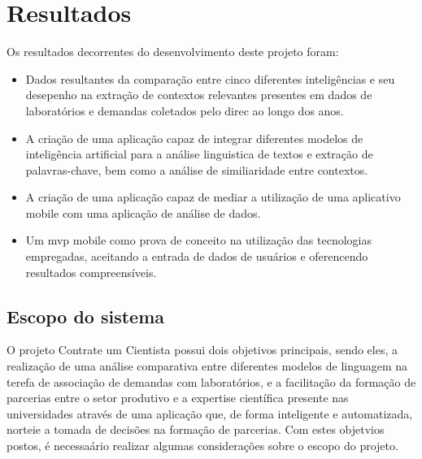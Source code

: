 \chapter{Resultados}\label{cap:resultados}

Os resultados decorrentes do desenvolvimento deste projeto foram:

\begin{itemize}
	\item Dados resultantes da comparação entre cinco diferentes inteligências e seu desepenho na extração de contextos relevantes presentes em dados de laboratórios e demandas coletados pelo \gls{direc} ao longo dos anos.
	\item A criação de uma aplicação capaz de integrar diferentes modelos de inteligência artificial para a análise linguistica de textos e extração de palavras-chave, bem como a análise de similiaridade entre contextos.
	\item A criação de uma aplicação capaz de mediar a utilização de uma aplicativo mobile com uma aplicação de análise de dados.
	\item Um \gls{mvp} mobile como prova de conceito na utilização das tecnologias empregadas, aceitando a entrada de dados de usuários e oferencendo resultados compreensíveis.
\end{itemize}

\section{Escopo do sistema}\label{sec:escopoSistema}

O projeto Contrate um Cientista possui dois objetivos principais, sendo eles, a realização de uma análise comparativa entre diferentes modelos de linguagem na terefa de associação de demandas com laboratórios, e a facilitação da formação de parcerias entre o setor produtivo e a expertise científica presente nas universidades através de uma aplicação que, de forma inteligente e automatizada, norteie a tomada de decisões na formação de parcerias. Com estes objetvios postos, é necessaário realizar algumas considerações sobre o escopo do projeto.

